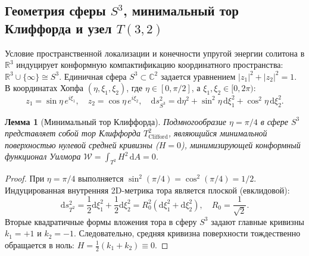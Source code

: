 \documentclass[11pt,a4paper]{article}
\newtheorem{lemma}[theorem]{Лемма}
\theoremstyle{definition}
\theoremstyle{remark}
\begin{document}
\subsection{Геометрия сферы $S^3$, минимальный тор Клиффорда и узел $T(3,2)$}
Условие пространственной локализации и конечности упругой энергии солитона в $\mathbb{R}^3$ индуцирует конформную компактификацию координатного пространства: $\mathbb{R}^3 \cup \{\infty\} \cong S^3$. Единичная сфера $S^3 \subset \mathbb{C}^2$ задается уравнением $|z_1|^2 + |z_2|^2 = 1$. В координатах Хопфа $(\eta, \xi_1, \xi_2)$, где $\eta \in [0, \pi/2]$, а $\xi_1, \xi_2 \in [0, 2\pi)$:
\begin{equation}
    z_1 = \sin\eta \, e^{i\xi_1}, \quad z_2 = \cos\eta \, e^{i\xi_2}, \quad \mathrm{d}s^2_{S^3} = \mathrm{d}\eta^2 + \sin^2\eta \, \mathrm{d}\xi_1^2 + \cos^2\eta \, \mathrm{d}\xi_2^2.
\end{equation}

\begin{lemma}[Минимальный тор Клиффорда]
Подмногообразие $\eta = \pi/4$ в сфере $S^3$ представляет собой тор Клиффорда $T^2_{\mathrm{Clifford}}$, являющийся минимальной поверхностью нулевой средней кривизны ($H=0$), минимизирующей конформный функционал Уилмора $\mathcal{W} = \int_{T^2} H^2 \, \mathrm{d}A = 0$.
\end{lemma}

\begin{proof}
При $\eta = \pi/4$ выполняется $\sin^2(\pi/4) = \cos^2(\pi/4) = 1/2$. Индуцированная внутренняя 2D-метрика тора является плоской (евклидовой):
\begin{equation}
    \mathrm{d}s^2_{T^2} = \frac{1}{2}\mathrm{d}\xi_1^2 + \frac{1}{2}\mathrm{d}\xi_2^2 = R_0^2 (\mathrm{d}\xi_1^2 + \mathrm{d}\xi_2^2), \quad R_0 = \frac{1}{\sqrt{2}}.
\end{equation}
Вторые квадратичные формы вложения тора в сферу $S^3$ задают главные кривизны $k_1 = +1$ и $k_2 = -1$. Следовательно, средняя кривизна поверхности тождественно обращается в ноль: $H = \frac{1}{2}(k_1 + k_2) \equiv 0$.
\end{proof}
\end{document}
